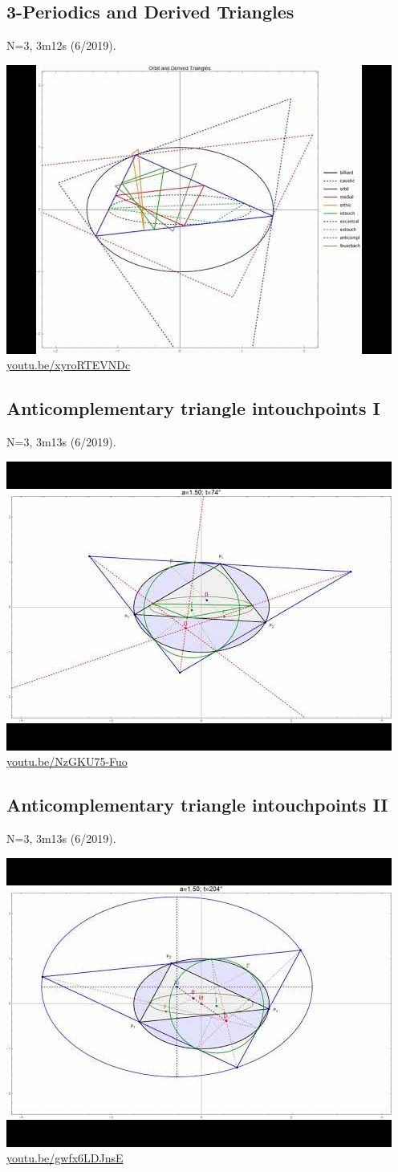 \documentclass[12pt]{amsart}
\begin{document}
\subsection{3-Periodics and Derived Triangles}
\label{vid:xyroRTEVNDc}
\noindent N=3, 3m12s (6/2019). 
\begin{center}\includegraphics[width=.5\textwidth]{pics/xyroRTEVNDc.jpg} \\ 
\href{https://youtu.be/xyroRTEVNDc}{\url{youtu.be/xyroRTEVNDc}}\end{center}
% 
\subsection{Anticomplementary triangle intouchpoints I}
\label{vid:NzGKU75-Fuo}
\noindent N=3, 3m13s (6/2019). 
\begin{center}\includegraphics[width=.5\textwidth]{pics/NzGKU75-Fuo.jpg} \\ 
\href{https://youtu.be/NzGKU75-Fuo}{\url{youtu.be/NzGKU75-Fuo}}\end{center}
% 
\subsection{Anticomplementary triangle intouchpoints II}
\label{vid:gwfx6LDJnsE}
\noindent N=3, 3m13s (6/2019). 
\begin{center}\includegraphics[width=.5\textwidth]{pics/gwfx6LDJnsE.jpg} \\ 
\href{https://youtu.be/gwfx6LDJnsE}{\url{youtu.be/gwfx6LDJnsE}}\end{center}
% 
\end{document}
